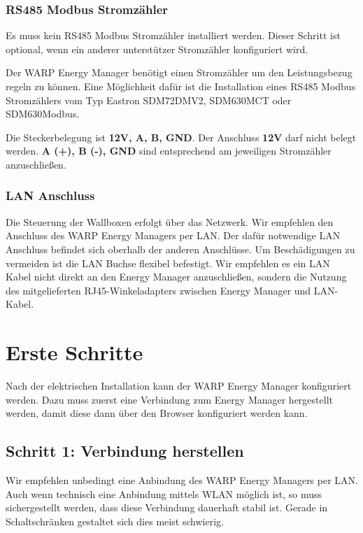 \documentclass[a4paper,10pt]{article}
\newcommand{\hint}[1]{\begin{tcolorbox}[colback=boxgray,colframe=black,coltext=
white,title=Hinweis,left*=2mm,right*=2mm,boxsep=1mm,bottom=1mm,top=1mm]#1\end{tcolorbox}}
\begin{document}
\begin{multicols*}{2}
	\subsubsection{RS485 Modbus Stromzähler}
	\hint{Es muss kein RS485 Modbus Stromzähler installiert werden. Dieser
	Schritt ist optional, wenn ein anderer unterstützer Stromzähler konfiguriert
	wird.}

	Der WARP Energy Manager benötigt einen Stromzähler um den Leistungsbezug regeln zu 
	können. Eine Möglichkeit dafür ist die Installation eines RS485 Modbus
	Stromzählers vom Typ Eastron SDM72DMV2, SDM630MCT oder SDM630Modbus.
	
	Die Steckerbelegung ist \textbf{12V, A, B, GND}. Der Anschluss \textbf{12V}
	darf nicht belegt werden. \textbf{A (+), B (-), GND} sind entsprechend 
	am jeweiligen Stromzähler anzuschließen.

	\subsubsection{LAN Anschluss}
	Die Steuerung der Wallboxen erfolgt über das Netzwerk. Wir empfehlen den
	Anschluss des WARP Energy Managers per LAN. Der dafür notwendige LAN
	Anschluss befindet sich oberhalb der anderen Anschlüsse. Um Beschädigungen
	zu vermeiden ist die LAN Buchse flexibel befestigt. Wir empfehlen es ein LAN
	Kabel nicht direkt an den Energy Manager anzuschließen, sondern die Nutzung 
	des mitgelieferten RJ45-Winkeladapters zwischen Energy Manager und
	LAN-Kabel.

	\section{Erste Schritte}
	\label{setup}

	Nach der elektrischen Installation kann der WARP Energy Manager konfiguriert
	werden. Dazu muss zuerst eine Verbindung zum Energy Manager hergestellt werden, 
	damit diese dann über den Browser konfiguriert werden kann.

	\subsection{Schritt 1: Verbindung herstellen}


	\hint{Wir empfehlen unbedingt eine Anbindung des WARP Energy Managers per
	LAN. Auch wenn technisch eine Anbindung mittels WLAN möglich ist, so muss
	sichergestellt werden, dass diese Verbindung dauerhaft stabil ist. Gerade in
	Schaltschränken gestaltet sich dies meist schwierig.}


\end{multicols*}
\end{document}
